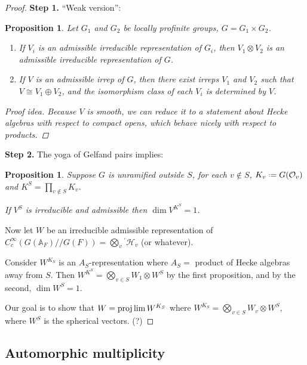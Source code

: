 \documentclass[11pt]{report}
\let\mbb\mathbb
\let\mc\mathcal
\newcommand{\1}{\mathbbm 1}
\newcommand{\A}{\mbb A}
\renewcommand{\O}{\mc O}
\newcommand*{\defeq}{\mathrel{\vcenter{\baselineskip0.5ex \lineskiplimit0pt
      \hbox{\scriptsize.}\hbox{\scriptsize.}}}%
  =}
\theoremstyle{plain}
\newcounter{ex}
\newtheorem{prop}[thm]{Proposition}
\theoremstyle{definition}
\theoremstyle{remark}
\numberwithin{equation}{section}
\begin{document}
\begin{proof}
  \textbf{Step 1.} ``Weak version'':
  \begin{prop}
    Let $G_{1}$ and $G_{2}$ be locally profinite groups, $G = G_{1}\times G_{2}$.

    \begin{enumerate}
    \item If
   $V_{i}$ is an admissible irreducible representation of $G_{i}$,
   then $V_{1}\otimes V_{2}$ is an admissible irreducible representation of
   $G$.
 \item If $V$ is an admissible irrep of $G$, then there exist irreps
   $V_{1}$ and $V_{2}$ such that $V \cong V_{1} \oplus V_{2}$, and the
   isomorphism class of each $V_{i}$ is determined by $V$. 
    \end{enumerate}

    \begin{proof}[Proof idea]
     Because $V$ is smooth, we can reduce it to a statement about
     Hecke algebras with respect to compact opens, which behave nicely
     with respect to products. 
    \end{proof}
  \end{prop}

  \textbf{Step 2.} The yoga of Gelfand pairs implies:
  \begin{prop}
    Suppose $G$ is unramified outside $S$, for each $v \notin S$, $K_{v} \defeq
    G(\O_{v})$ and $K^{S} = \prod_{v \notin S} K_{v}$.

    If $V^{S}$ is irreducible and admissible then $\dim V^{K^{S}} = 1$.
  \end{prop}

  Now let $W$ be an irreducible admissible representation of
  $C_{c}^{\infty}(G(\A_{F})//G(F)) = \bigotimes_{v} {}^{'} \mc H_{v}$ (or
  whatever).

  Consider $W^{K_{S}}$ is an $A_{S}$-representation where $A_{S} = $
  product of Hecke algebras away from $S$. Then $W^{K^{S}} =
  \bigotimes_{v \in S}W_{1} \otimes W^{S} $ by the first proposition, and by
  the second, $\dim W^{S} = 1$.

  Our goal is to show that $W = \projlim W^{K_{S}}$ where $W^{K_{S}} =
  \bigotimes_{v \in S} W_{v} \otimes W^{S}$, where $W^{S}$ is the spherical
  vectors. (?)
\end{proof}

\subsection{Automorphic multiplicity}
\label{sec:autom-mult}
\end{document}
